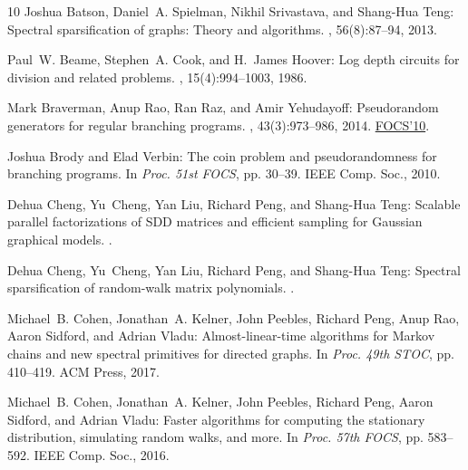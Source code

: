 \documentclass[11pt]{article}
\numberwithin{equation}{section}
\theoremstyle{definition}
\theoremstyle{plain}
\numberwithin{myalgctr}{section}
\theoremstyle{named}
\begin{document}
\begin{thebibliography}{10}
{\sc Joshua Batson, Daniel~A. Spielman, Nikhil Srivastava, and Shang-Hua Teng}:
  Spectral sparsification of graphs: {T}heory and algorithms.
, 56(8):87--94, 2013.
\newblock [\epfmtdoi{10.1145/2492007.2492029}]

{\sc Paul~W. Beame, Stephen~A. Cook, and H.~James Hoover}: Log depth circuits
  for division and related problems.
, 15(4):994--1003, 1986.
\newblock [\epfmtdoi{10.1137/0215070}]

{\sc Mark Braverman, Anup Rao, Ran Raz, and Amir Yehudayoff}: Pseudorandom
  generators for regular branching programs.
, 43(3):973--986, 2014.
\newblock \prelim \href{https://doi.org/10.1109/FOCS.2010.11}{FOCS'10}.
\newblock [\epfmtdoi{10.1137/120875673}]

{\sc Joshua Brody and Elad Verbin}: The coin problem and pseudorandomness for
  branching programs.
\newblock In {\em Proc. 51st FOCS}, pp. 30--39. IEEE Comp. Soc., 2010.

{\sc Dehua Cheng, Yu~Cheng, Yan Liu, Richard Peng, and Shang{-}Hua Teng}:
  Scalable parallel factorizations of {SDD} matrices and efficient sampling for
  {G}aussian graphical models.
.

{\sc Dehua Cheng, Yu~Cheng, Yan Liu, Richard Peng, and Shang-Hua Teng}:
  Spectral sparsification of random-walk matrix polynomials.
.

{\sc Michael~B. Cohen, Jonathan~A. Kelner, John Peebles, Richard Peng, Anup
  Rao, Aaron Sidford, and Adrian Vladu}: Almost-linear-time algorithms for
  {M}arkov chains and new spectral primitives for directed graphs.
\newblock In {\em Proc. 49th STOC}, pp. 410--419. ACM Press, 2017.
\newblock [\epfmtdoi{10.1145/3055399.3055463}]

{\sc Michael~B. Cohen, Jonathan~A. Kelner, John Peebles, Richard Peng, Aaron
  Sidford, and Adrian Vladu}: Faster algorithms for computing the stationary
  distribution, simulating random walks, and more.
\newblock In {\em Proc. 57th FOCS}, pp. 583--592. IEEE Comp. Soc., 2016.


\end{thebibliography}
\end{document}
